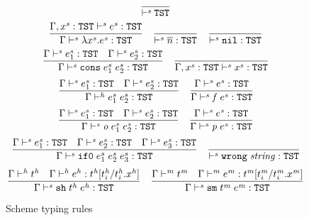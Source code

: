 \begin{figure}[p]
\[
\frac
{}
{\judts{}{\tytst}}
\]
\bigskip
\[
\frac
{\judes{\envexte{\varvars}{\tytst}}{\varexps}{\tytst}}
{\judes{\env}{\expfabsd{\varvars}{\varexps}}{\tytst}}
\quad
\frac
{}
{\judes{}{\expnum{n}}{\tytst}}
\quad
\frac
{}
{\judes{}{\expnild}{\tytst}}
\]
\[
\frac
{\judes{\env}{\first{\varexps}}{\tytst} \quad \judes{\env}{\second{\varexps}}{\tytst}}
{\judes{\env}{\expcons{\first{\varexps}}{\second{\varexps}}}{\tytst}}
\quad
\frac
{}
{\judes{\envexte{\varvars}{\tytst}}{\varvars}{\tytst}}
\]
\[
\frac
{\judes{\env}{\first{\varexps}}{\tytst} \quad \judes{\env}{\second{\varexps}}{\tytst}}
{\env\symjudh\expfapp{\first{\varexps}}{\second{\varexps}}:\tytst}
\quad
\frac
{\judes{\env}{\varexps}{\tytst}}
{\judes{\env}{\expfield{\varexps}}{\tytst}}
\]
\[
\frac
{\judes{\env}{\first{\varexps}}{\tytst} \quad \judes{\env}{\second{\varexps}}{\tytst}}
{\judes{\env}{\expop{\first{\varexps}}{\second{\varexps}}}{\tytst}}
\quad
\frac
{\judes{\env}{\varexps}{\tytst}}
{\judes{\env}{\exppred{\varexps}}{\tytst}}
\]
\[
\frac
{\judes{\env}{\first{\varexps}}{\tytst} \quad \judes{\env}{\second{\varexps}}{\tytst} \quad \judes{\env}{\third{\varexps}}{\tytst}}
{\judes{\env}{\expif{\first{\varexps}}{\second{\varexps}}{\third{\varexps}}}{\tytst}}
\quad
\frac
{}
{\judes{}{\expwrongd{\formvar{string}}}{\tytst}}
\]
\[
\frac
{\judth{\env}{\vartyh} \quad \judeh{\env}{\varexph}{\tyunlabh{\vartyh}}}
{\judes{\env}{\expsh{\vartyh}{\varexph}}{\tytst}}
\quad
\frac
{\judtm{\env}{\vartym} \quad \judem{\env}{\varexpm}{\tyunlabm{\vartym}}}
{\judes{\env}{\expsm{\vartym}{\varexpm}}{\tytst}}
\]
\caption{Scheme typing rules}
\label{str}
\end{figure}
